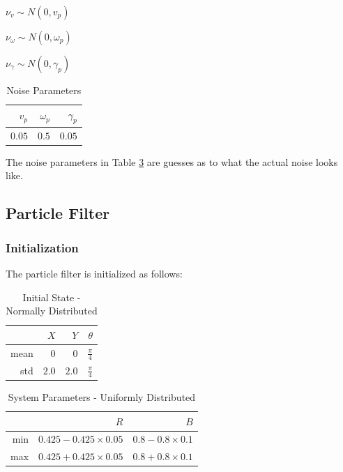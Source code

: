 \documentclass[twoside,twocolumn]{article}
\begin{document}
\begin{center}
$\nu_v \sim  N(0, v_p)$

$\nu_\omega \sim N(0, \omega_p)$

$\nu_\gamma \sim N(0, \gamma_p) $
\end{center}

\begin{table}[h!]
\centering
\caption{Noise Parameters}
\label{table:noise}
\begin{tabular}{rrr}
\hline
$v_p$ & $\omega_p$ & $\gamma_p$ \\ [0.5ex] 
\hline
$0.05$ & $0.5$ & $0.05$\\
\hline
\end{tabular}
\end{table}

The noise parameters in Table \ref{table:noise} are guesses as to what the actual noise looks like.

\subsection{Particle Filter}

\subsubsection{Initialization}
The particle filter is initialized as follows:

\begin{table}[h!]
\centering
\caption{Initial State - Normally Distributed}
\label{table:noise}
\begin{tabular}{rrrr}
\hline
 &$X$ & $Y$ & $\theta$ \\ [0.5ex] 
\hline
mean & $0$ & $0$ & $\frac{\pi}{4}$\\
std & $2.0$ & $2.0$ & $\frac{\pi}{4}$\\
\hline
\end{tabular}
\end{table}

\begin{table}[h!]
\centering
\caption{System Parameters - Uniformly Distributed}
\label{table:noise}
\begin{tabular}{rrr}
\hline
 &$R$ & $B$\\ [0.5ex] 
\hline
min & $0.425 - 0.425\times0.05$ & $0.8 - 0.8 \times 0.1$\\
max & $0.425 + 0.425\times0.05$ & $0.8 + 0.8 \times 0.1$\\
\hline
\end{tabular}
\end{table}
\end{document}
